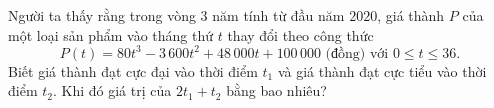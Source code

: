 \begin{ex}%
	Người ta thấy rằng trong vòng $3$ năm tính từ đầu năm $2020$, giá thành $P$ của một loại sản phẩm vào tháng thứ $t$ thay đổi theo công thức
	\[P(t)=80t^3-3\,600t^2+48\,000t+100\,000\text{ (đồng) với }0\le t\le 36.\]
	Biết giá thành đạt cực đại vào thời điểm $t_1$ và giá thành đạt cực tiểu vào thời điểm $t_2$. Khi đó giá trị của $2t_1+t_2$ bằng bao nhiêu?
	
\end{ex}

